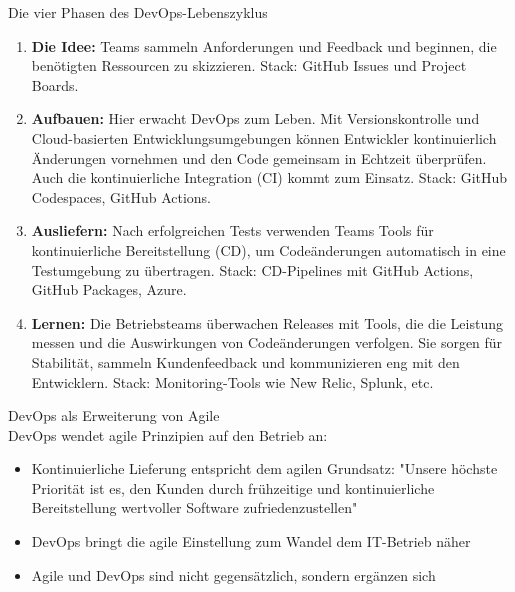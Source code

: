 \begin{concept}{Die vier Phasen des DevOps-Lebenszyklus}\\
    \begin{enumerate}
        \item \textbf{Die Idee:} Teams sammeln Anforderungen und Feedback und beginnen, die benötigten Ressourcen zu skizzieren. Stack: GitHub Issues und Project Boards.
        
        \item \textbf{Aufbauen:} Hier erwacht DevOps zum Leben. Mit Versionskontrolle und Cloud-basierten Entwicklungsumgebungen können Entwickler kontinuierlich Änderungen vornehmen und den Code gemeinsam in Echtzeit überprüfen. Auch die kontinuierliche Integration (CI) kommt zum Einsatz. Stack: GitHub Codespaces, GitHub Actions.
        
        \item \textbf{Ausliefern:} Nach erfolgreichen Tests verwenden Teams Tools für kontinuierliche Bereitstellung (CD), um Codeänderungen automatisch in eine Testumgebung zu übertragen. Stack: CD-Pipelines mit GitHub Actions, GitHub Packages, Azure.
        
        \item \textbf{Lernen:} Die Betriebsteams überwachen Releases mit Tools, die die Leistung messen und die Auswirkungen von Codeänderungen verfolgen. Sie sorgen für Stabilität, sammeln Kundenfeedback und kommunizieren eng mit den Entwicklern. Stack: Monitoring-Tools wie New Relic, Splunk, etc.
    \end{enumerate}
\end{concept}

\begin{concept}{DevOps als Erweiterung von Agile}\\
    DevOps wendet agile Prinzipien auf den Betrieb an:
    \begin{itemize}
        \item Kontinuierliche Lieferung entspricht dem agilen Grundsatz: "Unsere höchste Priorität ist es, den Kunden durch frühzeitige und kontinuierliche Bereitstellung wertvoller Software zufriedenzustellen"
        \item DevOps bringt die agile Einstellung zum Wandel dem IT-Betrieb näher
        \item Agile und DevOps sind nicht gegensätzlich, sondern ergänzen sich
    \end{itemize}
\end{concept}

